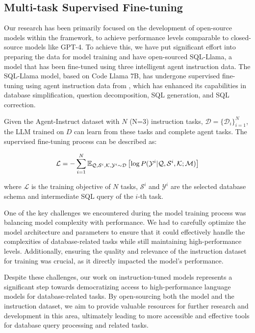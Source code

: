\subsection{Multi-task Supervised Fine-tuning}

Our research has been primarily focused on the development of open-source models within the \ours{} framework, to achieve performance levels comparable to closed-source models like GPT-4. 
To achieve this, we have put significant effort into preparing the data for model training and have open-sourced SQL-Llama, a model that has been fine-tuned using three intelligent agent instruction data. The SQL-Llama model, based on Code Llama 7B, has undergone supervised fine-tuning using agent instruction data from \ours{}, which has enhanced its capabilities in database simplification, question decomposition, SQL generation, and SQL correction.

Given the Agent-Instruct dataset with $N$ (N=3) instruction tasks, $\mathcal{D} = \{\mathcal{D}_{i}\}_{i=1}^{N}$, the LLM trained on $D$ can learn from these tasks and complete agent tasks. 
The supervised fine-tuning process can be described as:

\begin{equation}
\small
\mathcal{L} = -\sum_{i=1}^{N} \mathbb{E}_{\mathcal{Q},\mathcal{S}^{i},\mathcal{K},\mathcal{Y}^{i} \sim \mathcal{D} } \left[ \log P(\mathcal{Y}^{i} | \mathcal{Q}, \mathcal{S}^{i}, \mathcal{K}; \mathcal{M}) \right]
\label{eq:sft}
\end{equation}

where $\mathcal{L}$ is the training objective of $N$ tasks, $\mathcal{S}^{i}$ and $\mathcal{Y}^{i}$ are the selected database schema and intermediate SQL query of the $i$-th task.

One of the key challenges we encountered during the model training process was balancing model complexity with performance. We had to carefully optimize the model architecture and parameters to ensure that it could effectively handle the complexities of database-related tasks while still maintaining high-performance levels. Additionally, ensuring the quality and relevance of the instruction dataset for training was crucial, as it directly impacted the model's performance.

Despite these challenges, our work on instruction-tuned models represents a significant step towards democratizing access to high-performance language models for database-related tasks. By open-sourcing both the model and the instruction dataset, we aim to provide valuable resources for further research and development in this area, ultimately leading to more accessible and effective tools for database query processing and related tasks.

